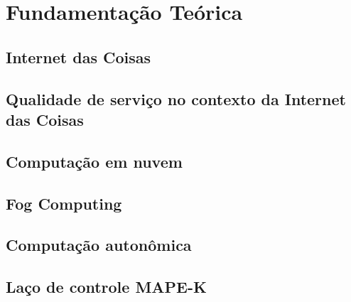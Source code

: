 \chapter{Fundamentação Teórica}

\section{Internet das Coisas}

\section{Qualidade de serviço no contexto da Internet das Coisas}

\section{Computação em nuvem}

\section{Fog Computing}

\section{Computação autonômica}

\section{Laço de controle MAPE-K}



